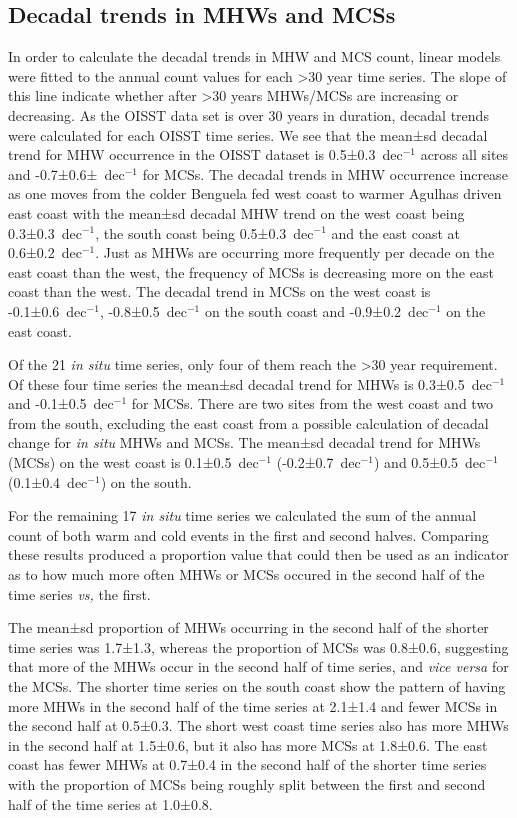\documentclass[a4paper,10pt,review]{elsarticle}
\begin{document}
\subsection{Decadal trends in MHWs and MCSs}
In order to calculate the decadal trends in MHW and MCS count, linear models were fitted to the annual count values for each >30 year time series. The slope of this line indicate whether after >30 years MHWs/MCSs are increasing or decreasing. As the OISST data set is over 30 years in duration, decadal trends were calculated for each OISST time series. We see that the mean±sd decadal trend for MHW occurrence in the OISST dataset is 0.5±0.3~dec$^{-1}$ across all sites and -0.7±0.6±~dec$^{-1}$ for MCSs. The decadal trends in MHW occurrence increase as one moves from the colder Benguela fed west coast to warmer Agulhas driven east coast with the mean±sd decadal MHW trend on the west coast being 0.3±0.3~dec$^{-1}$, the south coast being 0.5±0.3~dec$^{-1}$ and the east coast at 0.6±0.2~dec$^{-1}$. Just as MHWs are occurring more frequently per decade on the east coast than the west, the frequency of MCSs is decreasing more on the east coast than the west. The decadal trend in MCSs on the west coast is -0.1±0.6~dec$^{-1}$, -0.8±0.5~dec$^{-1}$ on the south coast and -0.9±0.2~dec$^{-1}$ on the east coast. 

Of the 21 \emph{in situ} time series, only four of them reach the >30 year requirement. Of these four time series the mean±sd decadal trend for MHWs is 0.3±0.5~dec$^{-1}$ and -0.1±0.5~dec$^{-1}$ for MCSs. There are two sites from the west coast and two from the south, excluding the east coast from a possible calculation of decadal change for \emph{in situ} MHWs and MCSs. The mean±sd decadal trend for MHWs (MCSs) on the west coast is 0.1±0.5~dec$^{-1}$ (-0.2±0.7~dec$^{-1}$) and 0.5±0.5~dec$^{-1}$ (0.1±0.4~dec$^{-1}$) on the south.

For the remaining 17 \emph{in situ} time series we calculated the sum of the annual count of both warm and cold events in the first and second halves. Comparing these results produced a proportion value that could then be used as an indicator as to how much more often MHWs or MCSs occured in the second half of the time series \emph{vs,} the first. 


The mean±sd proportion of MHWs occurring in the second half of the shorter time series was 1.7±1.3, whereas the proportion of MCSs was 0.8±0.6, suggesting that more of the MHWs occur in the second half of time series, and \emph{vice versa} for the MCSs. The shorter time series on the south coast show the pattern of having more MHWs in the second half of the time series at 2.1±1.4 and fewer MCSs in the second half at 0.5±0.3. The short west coast time series also has more MHWs in the second half at 1.5±0.6, but it also has more MCSs at 1.8±0.6. The east coast has fewer MHWs at 0.7±0.4 in the second half of the shorter time series with the proportion of MCSs being roughly split between the first and second half of the time series at 1.0±0.8.
\end{document}
